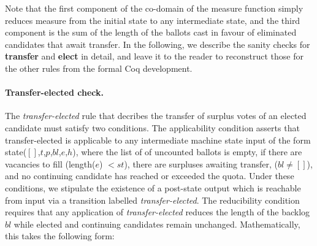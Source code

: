 \documentclass{llncs}
\begin{document}
\noindent
Note that the first component of the co-domain of the measure
function simply reduces measure from the initial state to any
intermediate state, and the third component is the sum of the length
of the ballots cast in favour of eliminated candidates that await
transfer. In the following, we describe
the sanity checks for \textbf{transfer} and \textbf{elect} in detail, 
and leave it to the reader to reconstruct those for the other rules
from the formal Coq development.

\paragraph{Transfer-elected check.} The
\emph{transfer-elected}  rule that decribes the transfer
of surplus votes of an elected candidate 
must satisfy two conditions. The applicability condition
asserts that transfer-elected is applicable to 
any intermediate machine state \textsf{input} of the
form \textsf{state}($[]$,$t$,$p$,$bl$,$e$,$h$), where the list of of
uncounted ballots is empty, if there are vacancies to fill
(\textsf{length}($e$) $< st$), there are surpluses awaiting transfer,
($bl \neq []$), and no continuing candidate has reached or
exceeded the quota. Under these conditions, we stipulate the
existence of a post-state 
\textsf{output} which is reachable from \textsf{input} via a
transition labelled \emph{transfer-elected}. 
The reducibility condition requires that any application of
\emph{transfer-elected} reduces the length of the backlog
$\mathit{bl}$ while elected and continuing candidates remain
unchanged.  Mathematically, this takes the following form:
\end{document}
